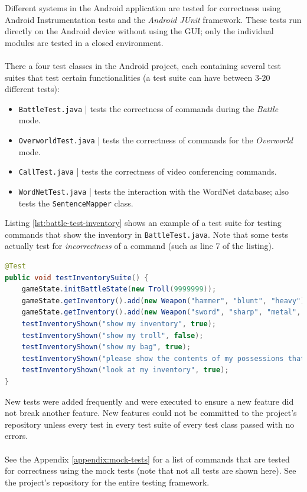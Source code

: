 \documentclass[11pt]{article}
\begin{document}
Different systems in the Android application are tested for correctness using Android Instrumentation tests and the \textit{Android JUnit} framework. These tests run directly on the Android device without using the GUI; only the individual modules are tested in a closed environment.
\\
\\
There a four test classes in the Android project, each containing several test suites that test certain functionalities (a test suite can have between 3-20 different tests):

\begin{itemize}
\item \texttt{BattleTest.java} | tests the correctness of commands during the \textit{Battle} mode.

\item \texttt{OverworldTest.java} | tests the correctness of commands for the \textit{Overworld} mode.

\item \texttt{CallTest.java} | tests the correctness of video conferencing commands.

\item \texttt{WordNetTest.java} | tests the interaction with the WordNet database; also tests the \texttt{SentenceMapper} class. 
\end{itemize}

Listing \ref{lst:battle-test-inventory} shows an example of a test suite for testing commands that show the inventory in \texttt{BattleTest.java}. Note that some tests actually test for \textit{incorrectness} of a command (such as line 7 of the listing).

\begin{lstlisting}[language=Java, label=lst:battle-test-inventory]
@Test
public void testInventorySuite() {
    gameState.initBattleState(new Troll(9999999));
    gameState.getInventory().add(new Weapon("hammer", "blunt", "heavy"));
    gameState.getInventory().add(new Weapon("sword", "sharp", "metal", "pointy"));
    testInventoryShown("show my inventory", true);
    testInventoryShown("show my troll", false);
    testInventoryShown("show my bag", true);
    testInventoryShown("please show the contents of my possessions that I have", true);
    testInventoryShown("look at my inventory", true);
}
\end{lstlisting}

New tests were added frequently and were executed to ensure a new feature did not break another feature. New features could not be committed to the project's repository unless every test in every test suite of every test class passed with no errors.
\\
\\
See the Appendix \ref{appendix:mock-tests} for a list of commands that are tested for correctness using the mock tests (note that not all tests are shown here). See the project's repository for the entire testing framework.
\end{document}
